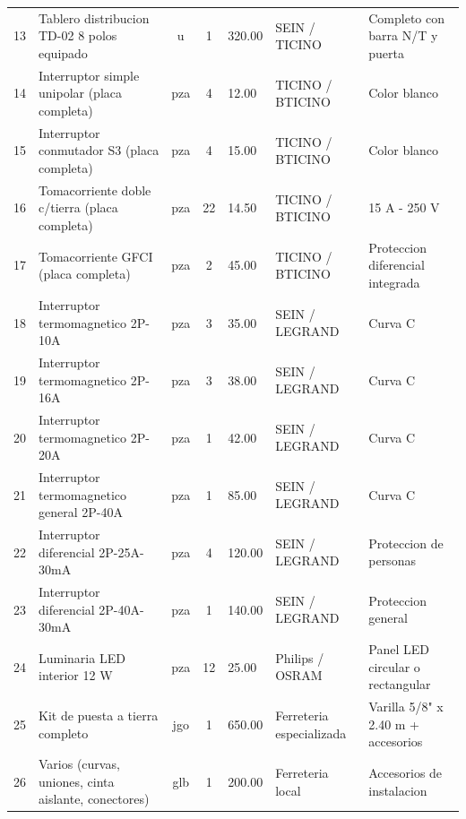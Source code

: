 \begin{longtable}{c L{4.0cm} c c R{1.4cm} L{2.0cm} L{3.5cm}}
13 & Tablero distribucion TD-02 8 polos equipado & u & 1 & 320.00 & SEIN / TICINO & Completo con barra N/T y puerta \\
14 & Interruptor simple unipolar (placa completa) & pza & 4 & 12.00 & TICINO / BTICINO & Color blanco \\
15 & Interruptor conmutador S3 (placa completa) & pza & 4 & 15.00 & TICINO / BTICINO & Color blanco \\
16 & Tomacorriente doble c/tierra (placa completa) & pza & 22 & 14.50 & TICINO / BTICINO & 15 A - 250 V \\
17 & Tomacorriente GFCI (placa completa) & pza & 2 & 45.00 & TICINO / BTICINO & Proteccion diferencial integrada \\
18 & Interruptor termomagnetico 2P-10A & pza & 3 & 35.00 & SEIN / LEGRAND & Curva C \\
19 & Interruptor termomagnetico 2P-16A & pza & 3 & 38.00 & SEIN / LEGRAND & Curva C \\
20 & Interruptor termomagnetico 2P-20A & pza & 1 & 42.00 & SEIN / LEGRAND & Curva C \\
21 & Interruptor termomagnetico general 2P-40A & pza & 1 & 85.00 & SEIN / LEGRAND & Curva C \\
22 & Interruptor diferencial 2P-25A-30mA & pza & 4 & 120.00 & SEIN / LEGRAND & Proteccion de personas \\
23 & Interruptor diferencial 2P-40A-30mA & pza & 1 & 140.00 & SEIN / LEGRAND & Proteccion general \\
24 & Luminaria LED interior 12 W & pza & 12 & 25.00 & Philips / OSRAM & Panel LED circular o rectangular \\
25 & Kit de puesta a tierra completo & jgo & 1 & 650.00 & Ferreteria especializada & Varilla 5/8" x 2.40 m + accesorios \\
26 & Varios (curvas, uniones, cinta aislante, conectores) & glb & 1 & 200.00 & Ferreteria local & Accesorios de instalacion \\
\end{longtable}
\endgroup